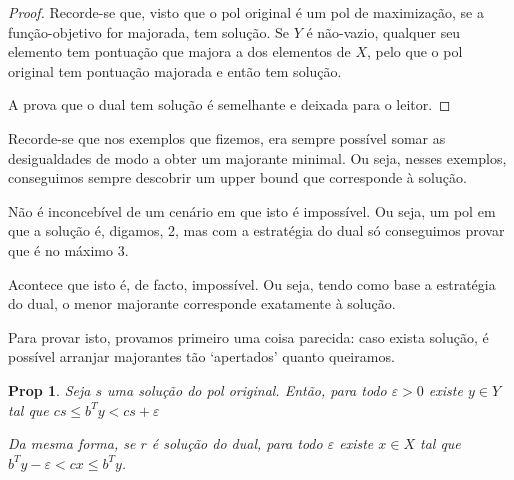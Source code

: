 \documentclass{article}
\newtheorem{prop}{Prop}
\theoremstyle{definition}
\begin{document}
	\begin{proof}
	Recorde-se que, visto que o pol original é um pol de maximização, se a função-objetivo for majorada, tem solução. Se $Y$ é não-vazio, qualquer seu elemento tem pontuação que majora a dos elementos de $X$, pelo que o pol original tem pontuação majorada e então tem solução.
	
	A prova que o dual tem solução é semelhante e deixada para o leitor.
	\end{proof}
	
	Recorde-se que nos exemplos que fizemos, era sempre possível somar as desigualdades de modo a obter um majorante minimal. Ou seja, nesses exemplos, 
conseguimos sempre descobrir um upper bound que corresponde à solução.

	Não é inconcebível de um cenário em que isto é impossível. Ou seja, um pol em que a solução é, digamos, 2, mas com a estratégia do dual só conseguimos provar que é no máximo 3.
	
	Acontece que isto é, de facto, impossível. Ou seja, tendo como base a estratégia do dual, o menor majorante corresponde exatamente à solução.
	
	Para provar isto, provamos primeiro uma coisa parecida: caso exista solução, é possível arranjar majorantes tão `apertados' quanto queiramos.
	
	\begin{prop}
	Seja $s$ uma solução do pol original. Então, para todo $\varepsilon > 0$ existe $y \in Y$ tal que $cs \leq b^T y < cs + \varepsilon$
	
	Da mesma forma, se $r$ é solução do dual, para todo $\varepsilon$ existe $x \in X$ tal que $b^T y - \varepsilon < cx \leq b^T y$.
	\end{prop}
	
\end{document}
